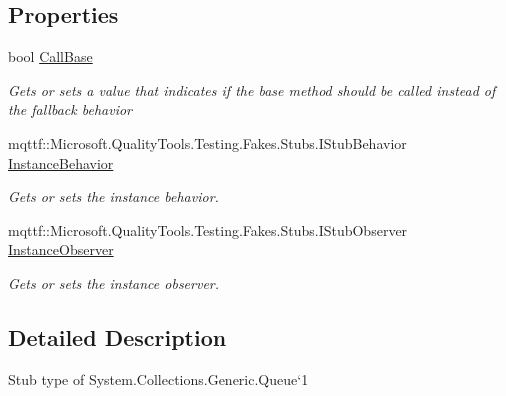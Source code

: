 \subsection*{Properties}
\begin{DoxyCompactItemize}
\item 
bool \hyperlink{class_system_1_1_collections_1_1_generic_1_1_fakes_1_1_stub_queue_3_01_t_01_4_a18103273fd54eb66e4ba5386a9588a31}{Call\-Base}
\begin{DoxyCompactList}\small\item\em Gets or sets a value that indicates if the base method should be called instead of the fallback behavior\end{DoxyCompactList}\item 
mqttf\-::\-Microsoft.\-Quality\-Tools.\-Testing.\-Fakes.\-Stubs.\-I\-Stub\-Behavior \hyperlink{class_system_1_1_collections_1_1_generic_1_1_fakes_1_1_stub_queue_3_01_t_01_4_a029837da11e5b258b6b9759a003271e5}{Instance\-Behavior}
\begin{DoxyCompactList}\small\item\em Gets or sets the instance behavior.\end{DoxyCompactList}\item 
mqttf\-::\-Microsoft.\-Quality\-Tools.\-Testing.\-Fakes.\-Stubs.\-I\-Stub\-Observer \hyperlink{class_system_1_1_collections_1_1_generic_1_1_fakes_1_1_stub_queue_3_01_t_01_4_aa9deb942e1e7fdee4ab3761e1715378a}{Instance\-Observer}
\begin{DoxyCompactList}\small\item\em Gets or sets the instance observer.\end{DoxyCompactList}\end{DoxyCompactItemize}


\subsection{Detailed Description}
Stub type of System.\-Collections.\-Generic.\-Queue`1



